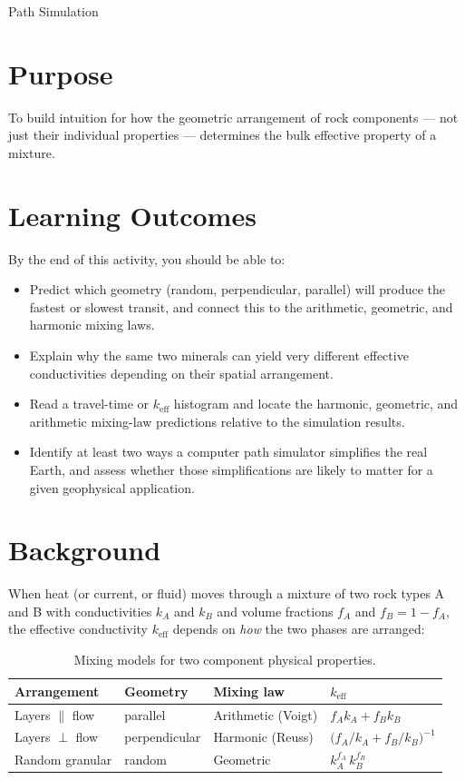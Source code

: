 \begin{activity}[Demo]{Path Simulation}

\section*{Purpose}
To build intuition for how the geometric arrangement of rock components --- not just their individual properties --- determines the bulk effective property of a mixture.

\section*{Learning Outcomes}

By the end of this activity, you should be able to:
\begin{itemize}
  \item Predict which geometry (random, perpendicular, parallel) will produce the fastest or slowest transit, and connect this to the arithmetic, geometric, and harmonic mixing laws.
  \item Explain why the same two minerals can yield very different effective conductivities depending on their spatial arrangement.
  \item Read a travel-time or $k_\text{eff}$ histogram and locate the harmonic, geometric, and arithmetic mixing-law predictions relative to the simulation results.
  \item Identify at least two ways a computer path simulator simplifies the real Earth, and assess whether those simplifications are likely to matter for a given geophysical application.
\end{itemize}

\section*{Background}

When heat (or current, or fluid) moves through a mixture of two rock types A and B with conductivities $k_A$ and $k_B$ and volume fractions $f_A$ and $f_B = 1-f_A$, the effective conductivity $k_\text{eff}$ depends on \emph{how} the two phases are arranged:

\begin{table}[h]
    \centering
    \caption{Mixing models for two component physical properties.}
    \label{tab:mixing}
    \renewcommand{\arraystretch}{1.4}
    \begin{tabular}{llll}
        \toprule
        \textbf{Arrangement} & \textbf{Geometry} & \textbf{Mixing law} & \textbf{$k_\text{eff}$} \\
        \midrule
        Layers $\parallel$ flow  & parallel & Arithmetic (Voigt) & $f_A k_A + f_B k_B$ \\
        Layers $\perp$ flow      & perpendicular   & Harmonic (Reuss)   & $\bigl(f_A/k_A + f_B/k_B\bigr)^{-1}$ \\
        Random granular          & random   & Geometric          & $k_A^{f_A}\, k_B^{f_B}$ \\
        \bottomrule
    \end{tabular}
\end{table}


\end{activity}
